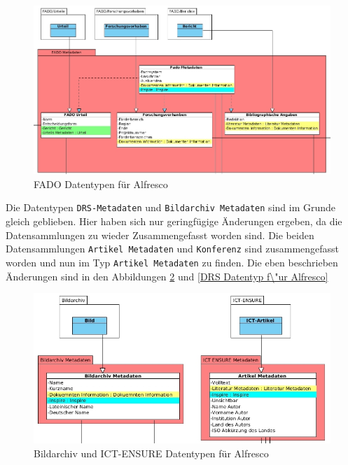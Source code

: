 \begin{figure}[!ht]
\centering
\includegraphics[width=16cm]{Bilder/AlfrescoModell/Fado-Datentypen.jpg}
\caption{FADO Datentypen f\"ur Alfresco}
\label{Fado Datentypen f\"ur Alfresco}
\centering
\end{figure}

Die Datentypen \texttt{DRS-Metadaten} und \texttt{Bildarchiv Metadaten} sind im Grunde gleich geblieben. Hier haben sich nur geringf\"ugige \"Anderungen ergeben, da die Datensammlungen zu wieder Zusammengefasst worden sind. Die beiden Datensammlungen \texttt{Artikel Metadaten} und \texttt{Konferenz} sind zusammengefasst worden und nun im Typ \texttt{Artikel Metadaten} zu finden.
Die eben beschrieben \"Anderungen sind in den Abbildungen \ref{Bildarchiv und ICT-ENSURE Datentypen f\"ur Alfresco} und \ref{DRS Datentyp f\"ur Alfresco}

\begin{figure}[!ht]
\centering
\includegraphics[width=12cm]{Bilder/AlfrescoModell/Bildarchiv-und-ICT-Datentypen.jpg}
\caption{Bildarchiv und ICT-ENSURE Datentypen f\"ur Alfresco}
\label{Bildarchiv und ICT-ENSURE Datentypen f\"ur Alfresco}
\centering
\end{figure}

